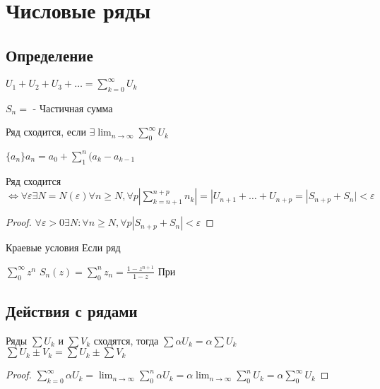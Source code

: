 \chapter{Числовые ряды}
\section{Определение}

\begin{definition}
  $U_1 + U_2 + U_3 + \dots = \sum\limits_{k = 0}^{\infty}{U_k}$
\end{definition}

\begin{definition}
  $S_n = $ - Частичная сумма
\end{definition}
\begin{definition}
  Ряд сходится, если $\exists \lim_{n \to \infty} \sum\limits_0^\infty U_k$
\end{definition}

\begin{definition}
  $\{a_n\} a_n = a_0 + \sum\limits_1^n (a_k - a_{k-1}$
\end{definition}

\begin{theorem}
  Ряд сходится $ \Leftrightarrow \forall \varepsilon \exists N = N(\varepsilon)
  \forall n \geq N, \forall p |\sum\limits_{k=n+1}^{n+p} n_k| = |U_{n+1} + \dots
  + U_{n+p} = |S_{n+p} + S_{n}| < \varepsilon$
\end{theorem}

\begin{proof}
  $\forall \varepsilon > 0 \exists N: \forall n \geq N, \forall p
  |S_{n+p} + S_{n}| < \varepsilon$
\end{proof}

\begin{definition}
  Краевые условия
  Если ряд
\end{definition}

\begin{example}
  $\sum\limits_0^\infty z^n$
  $S_n(z) = \sum\limits_0^n z_n = \frac{1-z^{n+1}}{1-z}$
  При
\end{example}

\section{Действия с рядами}
\begin{theorem}
  Ряды $\sum U_k$ и $\sum V_k$ сходятся, тогда
  $\sum\alpha U_k = \alpha\sum U_k$\\
  $\sum U_k \pm V_k = \sum U_k \pm \sum V_k$
\end{theorem}
\begin{proof}
  $\sum\limits_{k=0}^\infty \alpha U_k = \lim_{n \to \infty}
  \sum\limits_0^n \alpha U_k = \alpha \lim_{n \to \infty} \sum\limits_0^n U_k
  = \alpha \sum\limits_0^\infty U_k$
\end{proof}

